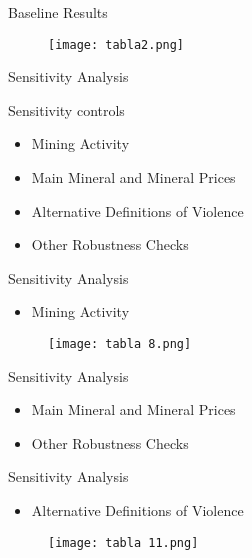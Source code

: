 \documentclass[pdftex,12pt,xcolor=pdftex,table]{beamer}
\theoremstyle{definition}
\theoremstyle{remark}
\numberwithin{equation}{section}
\numberwithin{figure}{section}
\begin{document}
        \begin{frame}{Baseline Results}
        \justifying
        \begin{figure}[H]
				\centering
				\texttt{[image: tabla2.png]}
				
		\end{figure}
   
 
    \end{frame}
  
        \begin{frame}{Sensitivity Analysis}
        \begin{block}{Sensitivity controls}
             \justifying
        \begin{itemize}
        \item Mining Activity
        \item Main Mineral and Mineral Prices
        \item Alternative Definitions of Violence
        \item Other Robustness Checks

    \end{itemize}
    \end{block}
  
  
    \end{frame}
    
        \begin{frame}{Sensitivity Analysis}
            \justifying
            \begin{itemize}
             \item Mining Activity
         \end{itemize}
         
        \begin{figure}[H]
				\centering
				\texttt{[image: tabla 8.png]}
				
			\end{figure}
     \end{frame}
     
         \begin{frame}{Sensitivity Analysis}
            \justifying
         \begin{itemize}
         \item Main Mineral and Mineral Prices
         \vfill 
         \item Other Robustness Checks
         \end{itemize}
         \end{frame}
         
         \begin{frame}{Sensitivity Analysis}
        \begin{itemize}
        \item Alternative Definitions of Violence
        \end{itemize}
         \begin{figure}[H]
				\centering
				\texttt{[image: tabla 11.png]}
				
			\end{figure}
        
        \end{frame}
         
\end{document}
